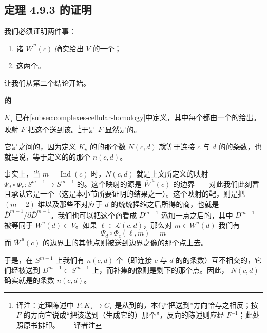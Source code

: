 \subsection{定理 4.9.3 的证明}%
\label{subsec:proof-main-theorem}

我们必须证明两件事：
\begin{enumerate}[label=(\arabic*)]
\item 诸 $\overline{W}^{\,u}(c)$ 确实给出 $V$ 的一个\trCellularDecomposition；
\item 这两个\trComplex{}\trIsomorphic。
\end{enumerate}
让我们从第二个结论开始。

\textbf{\trComplex{}的\trIsomorphism}

\trComplex{} $K_\star$ 已在\cref{subsec:complexes-cellular-homology}中定义，其中每个\trCellular{}都由一个\trCriticalPoint{}的\trUnstableManifold{}给出。映射 $F$ 把这个\trCriticalPoint{}送到该\trCellular{}。\footnote{译注：定理陈述中 $F\colon K_\star\to C_\star$ 是从\trCellular\trComplex{}到\trMorseComplex{}的\trIsomorphism，本句“把\trCriticalPoint{}送到\trCellular{}”方向恰与之相反；按 $F$ 的方向宜说成“把该\trCellular{}送到（生成它的）那个\trCriticalPoint{}”，反向的陈述则应经 $F^{-1}$；此处照原书排印。——译者注}于是 $F$ 显然是\trBijective{}的。

它是\trComplex{}之间的\trIsomorphism，因为定义 $K_\star$ 的\trDifferential{}的那个数 $N(c,d)$ 就等于连接 $c$ 与 $d$ 的\trTrajectory{}的条数，也就是说，等于定义\trMorseComplex{}的\trDifferential{}的那个 $n(c,d)$。

事实上，当 $m=\operatorname{Ind}(c)$ 时，$N(c,d)$ 就是上文所定义的映射 $\varPsi_d\circ\varPhi_c:S^{m-1}\to S^{m-1}$ 的\trMappingDegree。这个映射的源是 $\overline{W}^{\,u}(c)$ 的边界——对此我们此刻暂且承认它是一个\trSphere（这是本小节所要证明的结果之一）。这个映射的靶，则是把 $(m-2)$ 维\trSkeleton{}以及那些不对应于 $d$ 的\trSphere{}统统捏缩之后所得的商，也就是 $\overline{D}^{m-1}/\partial\overline{D}^{m-1}$。我们也可以把这个商看成 $D^{m-1}$ 添加一点之后的\trCompactification，其中\trOpen{}\trDisk{} $D^{m-1}$ 被等同于\trUnstableManifold{} $W^u(d)\subset V$。如果 $\ell\in\mathcal{L}(c,d)$，那么对 $m\in W^u(d)$ 我们有
\[
\varPsi_d\circ\varPhi_c(\ell,m)=m
\]
而 $\overline{W}^{\,u}(c)$ 的边界上的其他点则被送到边界之像的那个点上去。

于是，在 $S^{m-1}$ 上我们有 $n(c,d)$ 个（即连接 $c$ 与 $d$ 的\trTrajectory{}的条数）互不相交的\trDisk，它们经\trHomeomorphism{}被送到 $D^{m-1}\subset S^{m-1}$ 上，而补集的像则是剩下的那个点。因此，\trMappingDegree{} $N(c,d)$ 确实就是\trTrajectory{}的条数 $n(c,d)$。

